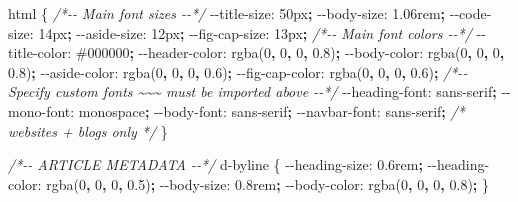 \documentclass[
]{book}
\newenvironment{Shaded}{\begin{snugshade}}{\end{snugshade}}
\newcommand{\CommentTok}[1]{\textcolor[rgb]{0.56,0.35,0.01}{\textit{#1}}}
\newcommand{\ConstantTok}[1]{\textcolor[rgb]{0.00,0.00,0.00}{#1}}
\newcommand{\DataTypeTok}[1]{\textcolor[rgb]{0.13,0.29,0.53}{#1}}
\newcommand{\DecValTok}[1]{\textcolor[rgb]{0.00,0.00,0.81}{#1}}
\newcommand{\FunctionTok}[1]{\textcolor[rgb]{0.00,0.00,0.00}{#1}}
\newcommand{\NormalTok}[1]{#1}
\newcommand{\OperatorTok}[1]{\textcolor[rgb]{0.81,0.36,0.00}{\textbf{#1}}}
\newcommand{\VariableTok}[1]{\textcolor[rgb]{0.00,0.00,0.00}{#1}}
\begin{document}
\begin{Shaded}
\begin{Highlighting}[]
\NormalTok{html \{}
  \CommentTok{/*{-}{-} Main font sizes {-}{-}*/}
  \VariableTok{{-}{-}title{-}size}\NormalTok{:      }\DecValTok{50}\DataTypeTok{px}\OperatorTok{;}
  \VariableTok{{-}{-}body{-}size}\NormalTok{:       }\DecValTok{1.06}\DataTypeTok{rem}\OperatorTok{;}
  \VariableTok{{-}{-}code{-}size}\NormalTok{:       }\DecValTok{14}\DataTypeTok{px}\OperatorTok{;}
  \VariableTok{{-}{-}aside{-}size}\NormalTok{:      }\DecValTok{12}\DataTypeTok{px}\OperatorTok{;}
  \VariableTok{{-}{-}fig{-}cap{-}size}\NormalTok{:    }\DecValTok{13}\DataTypeTok{px}\OperatorTok{;}
  \CommentTok{/*{-}{-} Main font colors {-}{-}*/}
  \VariableTok{{-}{-}title{-}color}\NormalTok{:     }\ConstantTok{\#000000}\OperatorTok{;}
  \VariableTok{{-}{-}header{-}color}\NormalTok{:    }\FunctionTok{rgba(}\DecValTok{0}\OperatorTok{,} \DecValTok{0}\OperatorTok{,} \DecValTok{0}\OperatorTok{,} \DecValTok{0.8}\FunctionTok{)}\OperatorTok{;}
  \VariableTok{{-}{-}body{-}color}\NormalTok{:      }\FunctionTok{rgba(}\DecValTok{0}\OperatorTok{,} \DecValTok{0}\OperatorTok{,} \DecValTok{0}\OperatorTok{,} \DecValTok{0.8}\FunctionTok{)}\OperatorTok{;}
  \VariableTok{{-}{-}aside{-}color}\NormalTok{:     }\FunctionTok{rgba(}\DecValTok{0}\OperatorTok{,} \DecValTok{0}\OperatorTok{,} \DecValTok{0}\OperatorTok{,} \DecValTok{0.6}\FunctionTok{)}\OperatorTok{;}
  \VariableTok{{-}{-}fig{-}cap{-}color}\NormalTok{:   }\FunctionTok{rgba(}\DecValTok{0}\OperatorTok{,} \DecValTok{0}\OperatorTok{,} \DecValTok{0}\OperatorTok{,} \DecValTok{0.6}\FunctionTok{)}\OperatorTok{;}
  \CommentTok{/*{-}{-} Specify custom fonts \textasciitilde{}\textasciitilde{}\textasciitilde{} must be imported above   {-}{-}*/}
  \VariableTok{{-}{-}heading{-}font}\NormalTok{:    }\DecValTok{sans{-}serif}\OperatorTok{;}
  \VariableTok{{-}{-}mono{-}font}\NormalTok{:       }\DecValTok{monospace}\OperatorTok{;}
  \VariableTok{{-}{-}body{-}font}\NormalTok{:       }\DecValTok{sans{-}serif}\OperatorTok{;}
  \VariableTok{{-}{-}navbar{-}font}\NormalTok{:     }\DecValTok{sans{-}serif}\OperatorTok{;}  \CommentTok{/* websites + blogs only */}
\NormalTok{\}}

\CommentTok{/*{-}{-} ARTICLE METADATA {-}{-}*/}
\NormalTok{d{-}byline \{}
  \VariableTok{{-}{-}heading{-}size}\NormalTok{:    }\DecValTok{0.6}\DataTypeTok{rem}\OperatorTok{;}
  \VariableTok{{-}{-}heading{-}color}\NormalTok{:   }\FunctionTok{rgba(}\DecValTok{0}\OperatorTok{,} \DecValTok{0}\OperatorTok{,} \DecValTok{0}\OperatorTok{,} \DecValTok{0.5}\FunctionTok{)}\OperatorTok{;}
  \VariableTok{{-}{-}body{-}size}\NormalTok{:       }\DecValTok{0.8}\DataTypeTok{rem}\OperatorTok{;}
  \VariableTok{{-}{-}body{-}color}\NormalTok{:      }\FunctionTok{rgba(}\DecValTok{0}\OperatorTok{,} \DecValTok{0}\OperatorTok{,} \DecValTok{0}\OperatorTok{,} \DecValTok{0.8}\FunctionTok{)}\OperatorTok{;}
\NormalTok{\}}


\end{Highlighting}
\end{Shaded}
\end{document}
